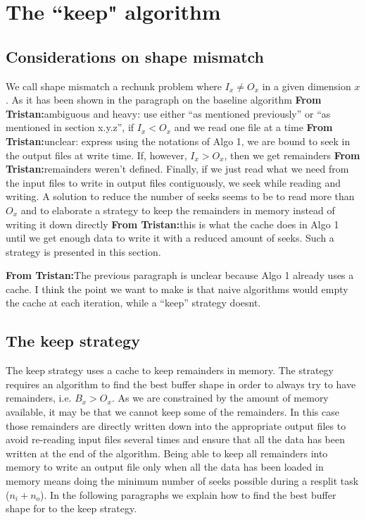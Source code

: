 \documentclass[conference]{IEEEtran}
\newcommand{\tristan}[1]{\color{orange}\textbf{From Tristan:}#1\color{black}}
\begin{document}
\section{The ``keep" algorithm}

\subsection{Considerations on shape mismatch}
We call shape mismatch a rechunk problem where $I_x \neq O_x$ in a given dimension $x$. As it
has been shown in the paragraph on the baseline algorithm \tristan{ambiguous and heavy: use either ``as mentioned previously'' or ``as mentioned in section x.y.z''}, if $I_x < O_x$ and
we read one file at a time \tristan{unclear: express using the notations of Algo 1}, we are bound to seek in the output files at
write time. If, however, $I_x > O_x$, then we get remainders \tristan{remainders weren't defined}. Finally, if we
just read what we need from the input files to write in output files
contiguously, we seek while reading and writing. A solution to reduce the
number of seeks seems to be to read more than $O_x$ and to elaborate a strategy
to keep the remainders in memory instead of writing it down directly \tristan{this is what the cache does in Algo 1} until we
get enough data to write it with a reduced amount of seeks. Such a strategy is
presented in this section.

\tristan{The previous paragraph is unclear because Algo 1 already uses a cache. I think the point we want to make is that
naive algorithms would empty the cache at each iteration, while a ``keep'' strategy doesnt.}

\subsection{The keep strategy}
The keep strategy uses a cache to keep remainders in memory.
The strategy requires an algorithm to find the best buffer shape in order to
always try to have remainders, i.e. $B_x>O_x$. As we are constrained by the
amount of memory available, it may be that we cannot keep some of the remainders.
In this case those remainders are directly written down into the appropriate
output files to avoid re-reading input files several times and ensure that all
the data has been written at the end of the algorithm. Being able to keep all
remainders into memory to write an output file only when all the data has been
loaded in memory means doing the minimum number of seeks possible during a
resplit task ($n_i + n_o$). In the following paragraphs we explain how to find
the best buffer shape for to the keep strategy.
\end{document}
